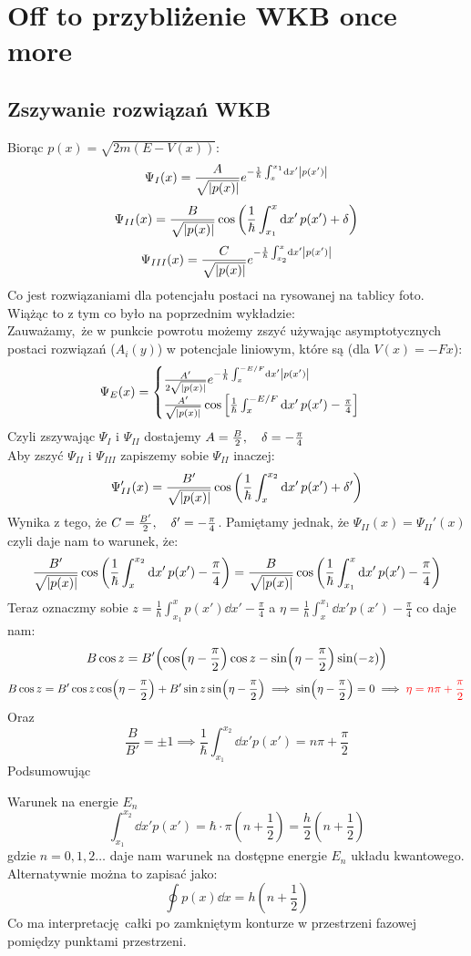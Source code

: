 \documentclass[12pt,a4paper]{report}
\newcommand{\com}[1]{{\color{red} #1}}
\newenvironment{lecture}[1]{\par\medskip
   \noindent\chapter{#1} \rmfamily}{\medskip}
\newenvironment{emph_box}[1]
    {\begin{center}\color{BrickRed}
    \begin{tabular}{|p{0.9\textwidth}|}
    \hline
    \begin{center} \color{Dandelion}{\textbf{#1}} \end{center}
    \begin{center}
    }
    {
    \end{center}
    \\\\\hline
    \end{tabular} 
    \end{center}
    \color{black}
    }
\begin{document}
\begin{lecture}{Off to przybliżenie WKB once more}
\section{Zszywanie rozwiązań WKB}
Biorąc $p(x) = \sqrt{2 m (E - V(x))}$:
\[
    \Psi_{I}(x) = \frac{A}{\sqrt{\abs{p(x)}}} e^{-\frac{1}{\hbar} \int_x^{x_1} \dd{x'} \abs{p(x')}}
\]
\[
    \Psi_{II}(x) = \frac{B}{\sqrt{\abs{p(x)}}} \cos\qty(\frac{1}{\hbar} \int^x_{x_1} \dd{x'} p(x') + \delta)
\]
\[
    \Psi_{III}(x) = \frac{C}{\sqrt{\abs{p(x)}}} e^{-\frac{1}{\hbar} \int_{x_2}^{x} \dd{x'} \abs{p(x')}}
\]
Co jest rozwiązaniami dla potencjału postaci na rysowanej na tablicy \com{foto}. Wiążąc to z tym co było na poprzednim wykładzie:\\
Zauważamy, że w punkcie powrotu możemy zszyć używając asymptotycznych postaci rozwiązań ($A_i(y)$) w potencjale liniowym, które są (dla $V(x) = - Fx$):
\[
    \Psi_E(x) = \begin{cases}
        \frac{A'}{2 \sqrt{\abs{p(x)}}} e^{-\frac{1}{\hbar} \int_x^{-E/F} \dd{x'} \abs{p(x')}}\\
        \frac{A'}{\sqrt{\abs{p(x)}}} \cos\qty[\frac{1}{\hbar} \int_x^{-E/F} \dd{x'} p(x') - \frac{\pi}{4}]
    \end{cases}
\]
Czyli zszywając $\Psi_{I}$ i $\Psi_{II}$ dostajemy $A = \frac{B}{2}\qc\delta=-\frac{\pi}{4}$\\
Aby zszyć $\Psi_{II}$ i $\Psi_{III}$ zapiszemy sobie $\Psi_{II}$ inaczej:
\[
    \Psi_{II}'(x) = \frac{B'}{\sqrt{\abs{p(x)}}} \cos\qty(\frac{1}{\hbar} \int_x^{x_2} \dd{x'} p(x') + \delta')
\]
Wynika z tego, że $C = \frac{B'}{2}\qc\delta' = -\frac{\pi}{4}$. Pamiętamy jednak, że $\Psi_{II}(x) = \Psi_{II}'(x)$ czyli daje nam to warunek, że:
\[
    \frac{B'}{\sqrt{\abs{p(x)}}} \cos\qty(\frac{1}{\hbar} \int_x^{x_2} \dd{x'} p(x') -\frac{\pi}{4}) = \frac{B}{\sqrt{\abs{p(x)}}} \cos\qty(\frac{1}{\hbar} \int^x_{x_1} \dd{x'} p(x') -\frac{\pi}{4})
\]
Teraz oznaczmy sobie $z = \frac{1}{\hbar} \int_{x_1}^x p(x') \dd{x'} - \frac{\pi}{4}$ a $\eta = \frac{1}{\hbar} \int_x^{x_1} \dd{x'} p(x') -\frac{\pi}{4}$ co daje nam:
\[
    B \cos z = B' \qty(\cos(\eta-\frac{\pi}{2}) \cos z - \sin (\eta - \frac{\pi}{2}) \sin (-z))
\]
\[
    B \cos z = B' \cos z \cos(\eta - \frac{\pi}{2}) + B' \sin z \sin(\eta- \frac{\pi}{2}) \implies \sin(\eta - \frac{\pi}{2}) = 0 \implies \color{red} \eta = n \pi + \frac{\pi}{2}
\]
Oraz
\[
    \frac{B}{B'} = \pm 1 \implies \frac{1}{\hbar} \int_{x_1}^{x_2} \dd{x'} p(x') = n \pi + \frac{\pi}{2}
\]
Podsumowując
\begin{emph_box}{Warunek na energie $E_n$}
\[
    \int_{x_1}^{x_2} \dd{x'} p(x') = \hbar \cdot \pi(n+ \frac{1}{2}) = \frac{h}{2}(n + \frac12)
\]
gdzie $n = 0,1, 2 \dots$ daje nam warunek na dostępne energie $E_n$ układu kwantowego.\\
Alternatywnie można to zapisać jako:
\[
    \oint p(x) \dd{x} = h(n + \frac12)
\]
Co ma interpretację całki po zamkniętym konturze w przestrzeni fazowej pomiędzy punktami przestrzeni.
\end{emph_box}


\end{lecture}
\end{document}
